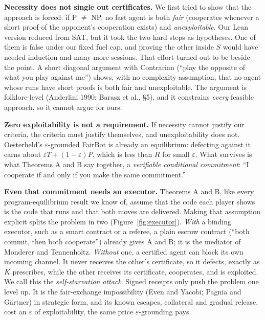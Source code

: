 \documentclass[11pt]{article}
\begin{document}
\textbf{Necessity does not single out certificates.} We first tried to show that the approach is forced: if P $\neq$ NP, no fast agent is both \emph{fair} (cooperates whenever a short proof of the opponent's cooperation exists) and \emph{unexploitable}. Our Lean version reduced from SAT, but it took the two hard steps as hypotheses. One of them is false under our fixed fuel cap, and proving the other inside $S$ would have needed induction and many more sessions. That effort turned out to be beside the point. A short diagonal argument with Contrarian (``play the opposite of what you play against me'') shows, with no complexity assumption, that no agent whose runs have short proofs is both fair and unexploitable. The argument is folklore-level (Anderlini 1990; Barasz et al., \S5), and it constrains \emph{every} feasible approach, so it cannot argue for ours.

\textbf{Zero exploitability is not a requirement.} If necessity cannot justify our criteria, the criteria must justify themselves, and unexploitability does not. Oesterheld's $\varepsilon$-grounded FairBot is already an equilibrium: defecting against it earns about $\varepsilon T + (1-\varepsilon)P$, which is less than $R$ for small $\varepsilon$. What survives is what Theorems A and B say together, a \emph{verifiable conditional commitment}: ``I cooperate if and only if you make the same commitment.''

\textbf{Even that commitment needs an executor.} Theorems A and B, like every program-equilibrium result we know of, assume that the code each player shows is the code that runs and that both moves are delivered. Making that assumption explicit splits the problem in two (Figure~\ref{fig:executor}). \emph{With} a binding executor, such as a smart contract or a referee, a plain escrow contract (``both commit, then both cooperate'') already gives A and B; it is the mediator of Monderer and Tennenholtz. \emph{Without} one, a certified agent can block its own incoming channel. It never receives the other's certificate, so it defects, exactly as $K$ prescribes, while the other receives its certificate, cooperates, and is exploited. We call this the \emph{self-starvation attack}. Signed receipts only push the problem one level up. It is the fair-exchange impossibility (Even and Yacobi; Pagnia and Gärtner) in strategic form, and its known escapes, collateral and gradual release, cost an $\varepsilon$ of exploitability, the same price $\varepsilon$-grounding pays.
\end{document}
